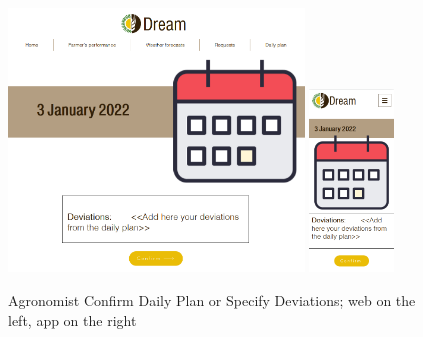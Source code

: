 \documentclass{article}
\begin{document}
        \begin{figure} [h]
            \centering
            \includegraphics[width=0.7\textwidth]{images/UserInterfaces/Agronomist/DailyPlan/ConfirmDeviationsWeb.png}
            \quad
            \includegraphics[width=0.2\textwidth]{images/UserInterfaces/Agronomist/DailyPlan/ConfirmDeviationsApp.png}
            \quad
            \caption{\label{fig:agronomistDPConfirmDeviations}Agronomist Confirm Daily Plan or Specify Deviations; web on the left, app on the right}
        \end{figure}
        \newpage
\end{document}
